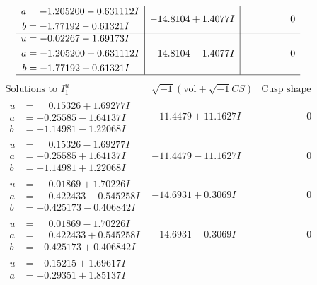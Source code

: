 \documentclass[1p]{elsarticle_modified}
\theoremstyle{definition}
\newcommand{\I}{\sqrt{-1}}
\begin{document}
$$\begin{array}{c|c|c}
\begin{aligned}
a &= -1.205200 - 0.631112 I \\
b &= -1.77192 - 0.61321 I\end{aligned}
 & -14.8104 + 1.4077 I & \phantom{-0.000000 } 0 \\ \hline\begin{aligned}
u &= -0.02267 - 1.69173 I \\
a &= -1.205200 + 0.631112 I \\
b &= -1.77192 + 0.61321 I\end{aligned}
 & -14.8104 - 1.4077 I & \phantom{-0.000000 } 0\\
 \hline 
 \end{array}$$\newpage$$\begin{array}{c|c|c}  
\text{Solutions to }I^u_{1}& \I (\text{vol} + \sqrt{-1}CS) & \text{Cusp shape}\\
 \hline 
\begin{aligned}
u &= \phantom{-}0.15326 + 1.69277 I \\
a &= -0.25585 - 1.64137 I \\
b &= -1.14981 - 1.22068 I\end{aligned}
 & -11.4479 + 11.1627 I & \phantom{-0.000000 } 0 \\ \hline\begin{aligned}
u &= \phantom{-}0.15326 - 1.69277 I \\
a &= -0.25585 + 1.64137 I \\
b &= -1.14981 + 1.22068 I\end{aligned}
 & -11.4479 - 11.1627 I & \phantom{-0.000000 } 0 \\ \hline\begin{aligned}
u &= \phantom{-}0.01869 + 1.70226 I \\
a &= \phantom{-}0.422433 - 0.545258 I \\
b &= -0.425173 - 0.406842 I\end{aligned}
 & -14.6931 + 0.3069 I & \phantom{-0.000000 } 0 \\ \hline\begin{aligned}
u &= \phantom{-}0.01869 - 1.70226 I \\
a &= \phantom{-}0.422433 + 0.545258 I \\
b &= -0.425173 + 0.406842 I\end{aligned}
 & -14.6931 - 0.3069 I & \phantom{-0.000000 } 0 \\ \hline\begin{aligned}
u &= -0.15215 + 1.69617 I \\
a &= -0.29351 + 1.85137 I \\

\end{aligned}
\end{array}$$
\end{document}
